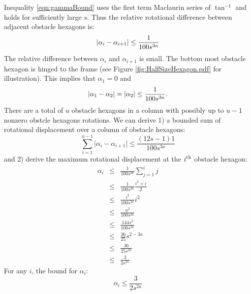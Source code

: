 \begin{equation}
\end{equation}
Inequality \ref{eqn:gammaBound} uses the first term Maclaurin series of $\tan^{-1}$ and holds for sufficiently large $s$.
Thus the relative rotational difference between adjacent obstacle hexagons is:
\begin{equation}\label{eqn:angularBound}
\left\vert \alpha_i - \alpha_{i+1} \right\vert \leq \frac{1}{	 100 s^{3\kappa}	}\\
\end{equation}
The relative difference between $\alpha_i$ and $\alpha_{i+1}$ is small.
The bottom most obstacle hexagon is hinged to the frame (see Figure \ref{fig:HalfSizeHexagon.pdf} for illustration). 
This implies that $\alpha_1 = 0$ and
$$\left\vert \alpha_1 - \alpha_2 \right\vert=\left\vert \alpha_2 \right\vert\leq \frac{1}{	 100 s^{3\kappa}	}.$$
There are a total of $u$ obstacle hexagons in a column with possibly up to $u-1$ nonzero obstcle hexagons rotations.
We can derive 1) a bounded sum of rotational displacement over a column of obstacle hexagons:
\begin{equation}\label{eqn:angularSumBound}
\sum_{i=1}^{u-1} \vert \alpha_i - \alpha_{i+1} \vert \leq \frac{(12s-1)1}{100s^{3\kappa}}
\end{equation}
and 2) derive the maximum rotational displacement at the $i^\text{th}$ obstacle hexagon:
\begin{eqnarray*}
\alpha_i &\leq& \frac{1}{100s^{3\kappa}} \sum_{j=1}^i j\\
		 &\leq& \frac{1}{100s^{3\kappa}}  \frac{i^2+i}{2}\\
		 &\leq& \frac{i^2}{100s^{3\kappa}}  i^2\\
		 &\leq& \frac{u^2}{100s^{3\kappa}}\\
		 &\leq& \frac{144s^2}{100s^{3\kappa}}\\
		 &\leq& \frac{36}{25} s^{2 - 3\kappa} \\
		 &\leq& \frac{36}{25s^{2\kappa}}\\
		 &\leq& \frac{3}{2 s^{2\kappa}}
\end{eqnarray*}
For any $i$, the bound for $\alpha_i$:
\begin{equation}\label{eqn:angularMaxBound}
\alpha_i \leq \frac{3}{2 s^{2\kappa}}
\end{equation}

